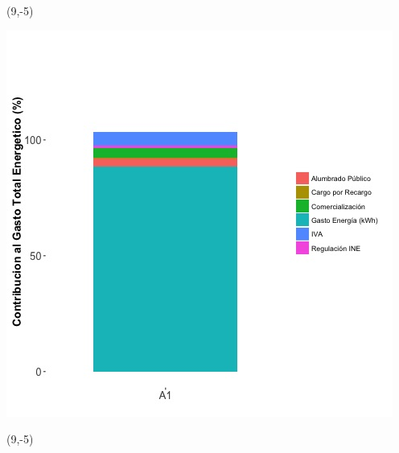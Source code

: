 \documentclass{article}\usepackage[]{graphicx}\usepackage[]{color}
\newenvironment{knitrout}{}{} %
\begin{document}
\begin{textblock}{1}(9,-5)
\begin{minipage}{20em}
\begingroup

\endgroup
\end{minipage}
\end{textblock}

\begin{knitrout}
\color{fgcolor}
\includegraphics[scale=0.65]{figure/A1_costvars_plot.jpg} 
\end{knitrout}

 \begin{textblock}{1}(9,-5)
\begin{minipage}{20em}
\begingroup

\endgroup
\end{minipage}
\end{textblock}
\end{document}
